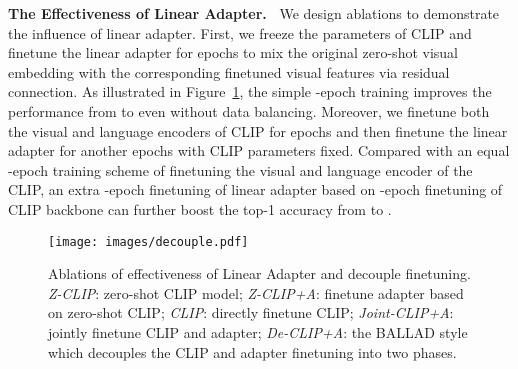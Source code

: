 \documentclass[10pt,twocolumn,letterpaper]{article}
\newcommand{\approach}{\textsc{BALLAD}}
\begin{document}
\noindent\textbf{The Effectiveness of Linear Adapter.~}
We design ablations to demonstrate the influence of linear adapter. First, we freeze the parameters of CLIP and finetune the linear adapter for  epochs to mix the original zero-shot visual embedding with the corresponding finetuned visual features via residual connection. As illustrated in Figure~\ref{fig:decouple}, the simple -epoch training improves the performance from  to  even without data balancing. 
Moreover, we finetune both the visual and language encoders of CLIP for  epochs and then finetune the linear adapter for another  epochs with CLIP parameters fixed. Compared with an equal -epoch training scheme of finetuning the visual and language encoder of the CLIP, an extra -epoch finetuning of linear adapter based on -epoch finetuning of CLIP backbone can further boost the top-1 accuracy from  to .
\begin{figure}[t!]
\centering
\texttt{[image: images/decouple.pdf]}
\caption{Ablations of effectiveness of Linear Adapter and decouple finetuning. \textit{Z-CLIP}: zero-shot CLIP model; \textit{Z-CLIP+A}: finetune adapter based on zero-shot CLIP; \textit{CLIP}: directly finetune CLIP; \textit{Joint-CLIP+A}: jointly finetune CLIP and adapter; \textit{De-CLIP+A}: the \approach{} style which decouples the CLIP and adapter finetuning into two phases.}
\vspace*{-8pt}
\label{fig:decouple}
\end{figure}

\begin{table}[t!]
    \centering
    \small
    \caption{Variants of linear adapter. \textit{V-Adapter} and \textit{L-Adapter} represents using linear adapter layer to adapt visual and language encoders respectively. All results are trained on ImageNet-LT for  epochs.}
    \vspace*{-15pt}
    \label{tab:where adapt}
\end{table}
\end{document}
